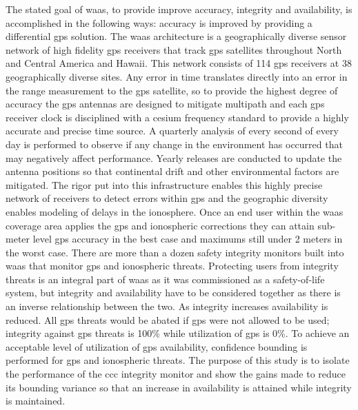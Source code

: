 The stated goal of \ac{waas}, to provide improve accuracy, integrity and availability, is accomplished in the following ways: accuracy is improved by providing a differential \ac{gps} solution. The \ac{waas} architecture is a geographically diverse sensor network of high fidelity \ac{gps} receivers that track \ac{gps} satellites throughout North and Central America and Hawaii. This network consists of 114 \ac{gps} receivers at 38 geographically diverse sites.  Any error in time translates directly into an error in the range measurement to the \ac{gps} satellite, so to provide the highest degree of accuracy the \ac{gps} antennas are designed to mitigate multipath and each \ac{gps} receiver clock is disciplined with a cesium frequency standard to provide a highly accurate and precise time source. A quarterly analysis of every second of every day is performed to observe if any change in the environment has occurred that may negatively affect performance. Yearly releases are conducted to update the antenna positions so that continental drift and other environmental factors are mitigated. The rigor put into this infrastructure enables this highly precise network of receivers to detect errors within \ac{gps} and the geographic diversity enables modeling of delays in the ionosphere. Once an end user within the \ac{waas} coverage area applies the \ac{gps} and ionospheric corrections they can attain sub-meter level \ac{gps} accuracy in the best case and maximums still under 2 meters in the worst case. There are more than a dozen safety integrity monitors built into \ac{waas} that monitor \ac{gps} and ionospheric threats. Protecting users from integrity threats is an integral part of \ac{waas} as it was commissioned as a safety-of-life system, but integrity and availability have to be considered together as there is an inverse relationship between the two. As integrity increases availability is reduced. All \ac{gps} threats would be abated if \ac{gps} were not allowed to be used; integrity against \ac{gps} threats is 100\% while utilization of \ac{gps} is 0\%.  To achieve an acceptable level of utilization of \ac{gps} availability, confidence bounding is performed for \ac{gps} and ionospheric threats. The purpose of this study is to isolate the performance of the \ac{ccc} integrity monitor and show the gains made to reduce its bounding variance so that an increase in availability is attained while integrity is maintained.

